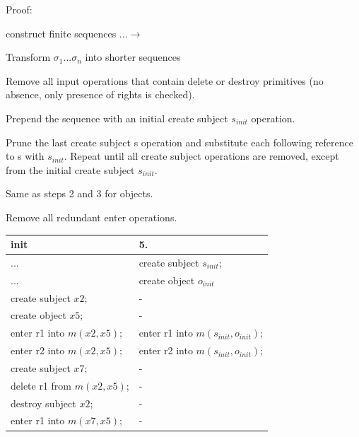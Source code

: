 \documentclass[a4paper]{article}
\begin{document}
\begin{multicols}{3}
    Proof:
    \begin{itemize*}
        \item construct finite sequences ...$\rightarrow$
        \item Transform $\sigma_1...\sigma_n$ into shorter sequences
        \begin{enumerate*}
            \item Remove all input operations that contain delete or destroy primitives (no absence, only presence of rights is checked).
            \item Prepend the sequence with an initial create subject $s_{init}$ operation.
            \item Prune the last create subject s operation and substitute each following reference to s with $s_{init}$. Repeat until all create subject operations are removed, except from the initial create subject $s_{init}$.
            \item Same as steps 2 and 3 for objects.
            \item Remove all redundant enter operations.
        \end{enumerate*}
    \end{itemize*}

    \begin{tabular}{l|l}
        init                       & 5.                                    \\\hline
        ...                        & create subject $s_{init}$;            \\
        ...                        & create object $o_{init}$              \\
        create subject $x2;$       & -                                     \\
        create object $x5;$        & -                                     \\
        enter r1 into $m(x2,x5);$  & enter r1 into $m(s_{init},o_{init})$; \\
        enter r2 into $m(x2,x5);$  & enter r2 into $m(s_{init},o_{init})$; \\
        create subject $x7;$       & -                                     \\
        delete r1 from $m(x2,x5)$; & -                                     \\
        destroy subject $x2;$      & -                                     \\
        enter r1 into $m(x7,x5);$  & -
    \end{tabular}


\end{multicols}
\end{document}
